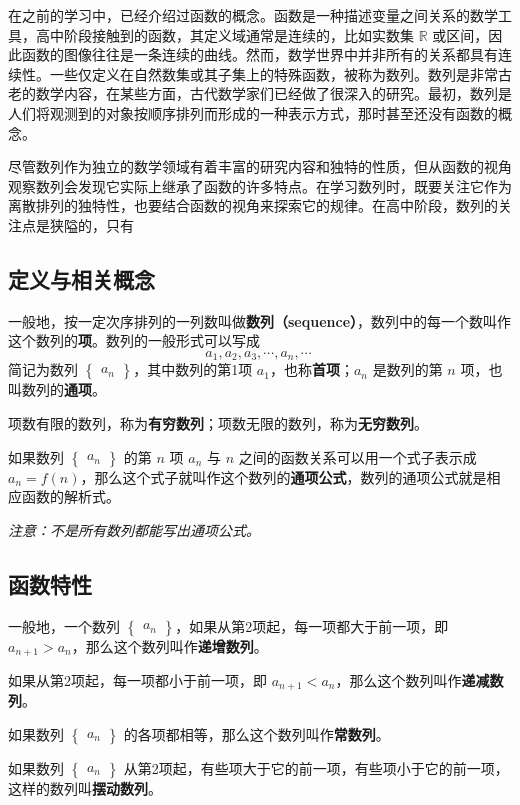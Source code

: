 
\begin{issues}
\issueDraft
\end{issues}

在之前的学习中，已经介绍过函数的概念。函数是一种描述变量之间关系的数学工具，高中阶段接触到的函数，其定义域通常是连续的，比如实数集 $\mathbb{R}$ 或区间，因此函数的图像往往是一条连续的曲线。然而，数学世界中并非所有的关系都具有连续性。一些仅定义在自然数集或其子集上的特殊函数，被称为数列。数列是非常古老的数学内容，在某些方面，古代数学家们已经做了很深入的研究。最初，数列是人们将观测到的对象按顺序排列而形成的一种表示方式，那时甚至还没有函数的概念。

尽管数列作为独立的数学领域有着丰富的研究内容和独特的性质，但从函数的视角观察数列会发现它实际上继承了函数的许多特点。在学习数列时，既要关注它作为离散排列的独特性，也要结合函数的视角来探索它的规律。在高中阶段，数列的关注点是狭隘的，只有


\subsection{定义与相关概念}

一般地，按一定次序排列的一列数叫做\textbf{数列（sequence）}，数列中的每一个数叫作这个数列的\textbf{项}。数列的一般形式可以写成
\begin{equation}
a_1,a_2,a_3,\cdots,a_n,\cdots~
\end{equation}
简记为数列 $\begin{Bmatrix} a_n \end{Bmatrix}$，其中数列的第1项 $a_1$，也称\textbf{首项}；$a_n$ 是数列的第 $n$ 项，也叫数列的\textbf{通项}。

项数有限的数列，称为\textbf{有穷数列}；项数无限的数列，称为\textbf{无穷数列}。

如果数列 $\begin{Bmatrix} a_n \end{Bmatrix}$ 的第 $n$ 项 $a_n$ 与 $n$ 之间的函数关系可以用一个式子表示成 $a_n = f(n)$，那么这个式子就叫作这个数列的\textbf{通项公式}，数列的通项公式就是相应函数的解析式。

\textsl{注意：不是所有数列都能写出通项公式。}

\subsection{函数特性}
一般地，一个数列 $\begin{Bmatrix} a_n \end{Bmatrix}$，如果从第2项起，每一项都大于前一项，即 $a_{n+1}>a_n$，那么这个数列叫作\textbf{递增数列}。

如果从第2项起，每一项都小于前一项，即 $a_{n+1}<a_n$，那么这个数列叫作\textbf{递减数列}。

如果数列 $\begin{Bmatrix} a_n \end{Bmatrix}$ 的各项都相等，那么这个数列叫作\textbf{常数列}。

如果数列 $\begin{Bmatrix} a_n \end{Bmatrix}$ 从第2项起，有些项大于它的前一项，有些项小于它的前一项，这样的数列叫\textbf{摆动数列}。
